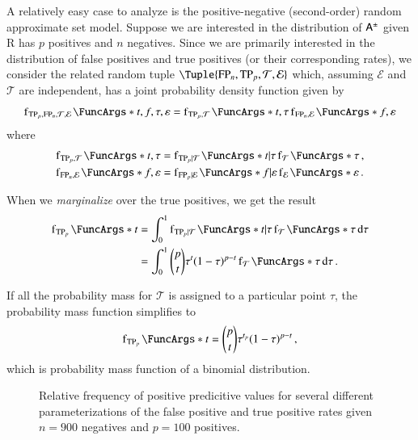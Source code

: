 \documentclass[10pt,final,hidelinks]{article}
\numberwithin{equation}{section}
\providecommand{\Given}{\vert}
\newcommand{\p}{p}
\newcommand{\n}{n}
\newcommand{\FPR}{\mathcal{E}}
\newcommand{\TPR}{\mathcal{T}}
\newcommand{\TP}{\RV{TP}}
\newcommand{\FP}{\RV{FP}}
\newcommand{\tprate}{\tau}
\newcommand{\fprate}{\varepsilon}
\newcommand{\RV}[1]{\mathrm{#1}}
\theoremstyle{plain}
\begin{document}
A relatively easy case to analyze is the positive-negative (second-order) random approximate set model.
Suppose we are interested in the distribution of $\ASet{A}$ given $\RV{R}$ has $p$ positives and $n$ negatives.
Since we are primarily interested in the distribution of false positives and true positives (or their corresponding rates), we consider the related random tuple $\Tuple{\FP_n, \TP_p, \TPR, \FPR}$ which, assuming $\FPR$ and $\TPR$ are independent, has a joint probability density function given by
\begin{equation}
	\PDF{t,f,\tprate,\fprate}[\TP_p, \FP_n,\TPR,\FPR] = \PDF{t, \tprate}[\TP_p,\TPR] \PDF{f,\fprate}[\FP_n,\FPR]
\end{equation}
where
\begin{align}
	\PDF{t,\tprate}[\TP_p,\TPR] &= \PDF{t \Given \tprate}[\TP_p \Given \TPR] \PDF{\tprate}[\TPR]\,,\\
	\PDF{f,\fprate}[\FP_n,\FPR] &= \PDF{f \Given \fprate}[\FP_p \Given \FPR] \PDF{\fprate}[\FPR]\,.
\end{align}

When we \emph{marginalize} over the true positives, we get the result
\begin{equation}
\begin{split}
	\PDF{t}[\TP_p] &= \int_{0}^{1} \PDF{t \Given \tprate}[\TP_p \Given \TPR] \PDF{\tprate}[\TPR] \dif \tprate\\
	                 &= \int_{0}^{1} \binom{p}{t} \tprate^{t}(1-\tprate)^{p-t} \PDF{\tprate}[\TPR] \dif \tprate\,.
\end{split}
\end{equation}

If all the probability mass for $\TPR$ is assigned to a particular point $\tprate$, the probability mass function simplifies to
\begin{equation}
\PDF{t}[\TP_p] = \binom{p}{t} \tprate^{t_p}(1-\tprate)^{p-t}\,,
\end{equation}
which is probability mass function of a binomial distribution.

\begin{figure}
	\def\svgwidth{\columnwidth}
	\centering
	\captionsetup{justification=centering}
	\caption
	{
		Relative frequency of positive predicitive values for several different parameterizations of the false positive and true positive rates given $\n = 900$ negatives and $\p=100$ positives.
	}    
	
	\label{fig:mixnorm}
\end{figure}
\end{document}
